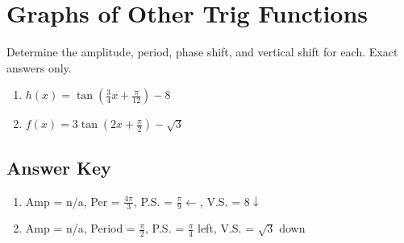 \chapter{Graphs of Other Trig Functions}

Determine the amplitude, period, phase shift, and vertical shift for each. Exact answers only.

\begin{enumerate}
	\item $h(x) = \tan\left(\frac{3}{4}x + \frac{\pi}{12}\right) - 8$
	\item $f(x)=3\tan\left(2x+\frac{\pi}{2}\right)-\sqrt{3}$
\end{enumerate}

\newpage

\section{Answer Key}

\begin{enumerate}
	\item Amp = n/a, Per = $\frac{4\pi}{3}$, P.S. = $\frac{\pi}{9} \leftarrow$, V.S. = $8 \downarrow$
	\item Amp = n/a, Period = $\frac{\pi}{2}$, P.S. = $\frac{\pi}{4}$ left, V.S. = $\sqrt{3}$ down
\end{enumerate}